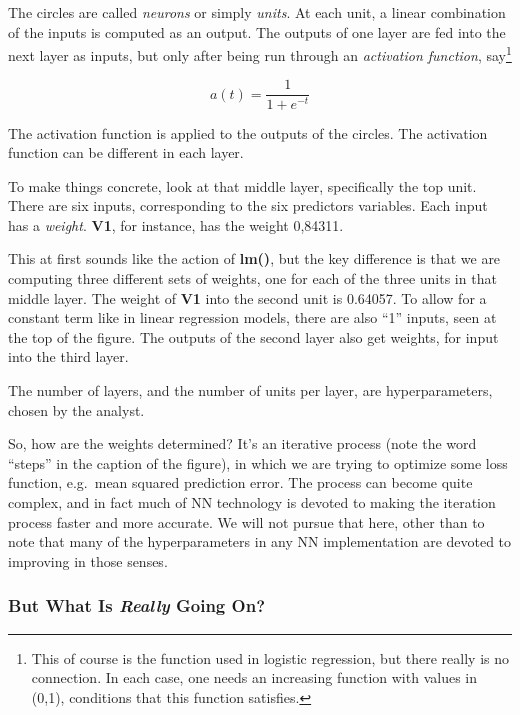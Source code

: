 The circles are called \textit{neurons} or simply \textit{units}.  At
each unit, a linear combination of the inputs is computed as an output.
The outputs of one layer are fed into the next layer as inputs, but only
after being run through an \textit{activation function},
say\footnote{This of course is the function used in logistic regression,
but there really is no connection.  In each case, one needs an
increasing function with values in (0,1), conditions that this function
satisfies.}

\begin{equation}
\label{logit}
a(t) = \frac{1}{1 + e^{-t}}
\end{equation}

The activation function is applied to the outputs of the circles. The
activation function can be different in each layer.

To make things concrete, look at that middle layer, specifically the top
unit.  There are six inputs, corresponding to the six predictors
variables.  Each input has a \textit{weight}.  \textbf{V1}, for
instance, has the weight 0,84311.

This at first sounds like the action of \textbf{lm()}, but the key
difference is that we are computing three different sets of weights, one
for each of the three units in that middle layer.  The weight of
\textbf{V1} into the second unit is 0.64057.  To allow for a constant
term like in linear regression models, there are also ``1'' inputs, seen
at the top of the figure.  The outputs of the second layer also get
weights, for input into the third layer.

The number of layers, and the number of units per layer, are
hyperparameters, chosen by the analyst.

So, how are the weights determined?  It's an iterative process (note the
word ``steps'' in the caption of the figure), in which we are trying to
optimize some loss function, e.g.\ mean squared prediction error.  The
process can become quite complex, and in fact much of NN technology is
devoted to making the iteration process faster and more accurate.  We
will not pursue that here, other than to note that many of the
hyperparameters in any NN implementation are devoted to improving in
those senses.

\subsubsection{But What Is \emph{Really} Going On?}

